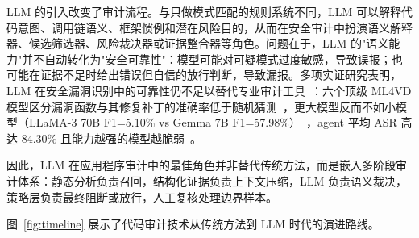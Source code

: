 \documentclass[11pt,a4paper,onecolumn]{article}
\begin{document}
LLM 的引入改变了审计流程。与只做模式匹配的规则系统不同，LLM 可以解释代码意图、调用链语义、框架惯例和潜在风险目的，从而在安全审计中扮演语义解释器、候选筛选器、风险裁决器或证据整合器等角色。问题在于，LLM 的"语义能力"并不自动转化为"安全可靠性"：模型可能对可疑模式过度敏感，导致误报；也可能在证据不足时给出错误但自信的放行判断，导致漏报。多项实证研究表明，LLM 在安全漏洞识别中的可靠性仍不足以替代专业审计工具~\cite{ullaha_vuln_reasoning_2024,paquette2024llmscannot,risse2024limits}：六个顶级 ML4VD 模型区分漏洞函数与其修复补丁的准确率低于随机猜测~\cite{risse2024limits}，更大模型反而不如小模型（LLaMA-3 70B F1=5.10\% vs Gemma 7B F1=57.98\%）~\cite{niu2025largetomammoth}，agent 平均 ASR 高达 84.30\% 且能力越强的模型越脆弱~\cite{zhang2024asb}。

因此，LLM 在应用程序审计中的最佳角色并非替代传统方法，而是嵌入多阶段审计体系：静态分析负责召回，结构化证据负责上下文压缩，LLM 负责语义裁决，策略层负责最终阻断或放行，人工复核处理边界样本。

图~\ref{fig:timeline} 展示了代码审计技术从传统方法到 LLM 时代的演进路线。
\end{document}
